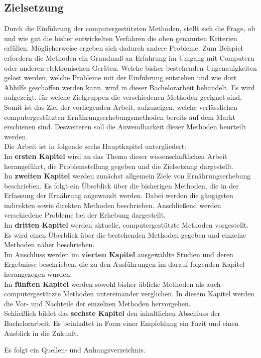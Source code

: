\subsection{Zielsetzung}


Durch die Einführung der computergestützten Methoden, stellt sich die Frage, ob und wie gut die bisher entwickelten Verfahren die oben genannten Kriterien erfüllen. Möglicherweise ergeben sich dadurch andere Probleme. Zum Beispiel erfordern die Methoden ein Grundmaß an Erfahrung im Umgang mit Computern oder anderen elektronischen Geräten. Welche bisher bestehenden Ungenauigkeiten gelöst werden, welche Probleme mit der Einführung entstehen und wie dort Abhilfe geschaffen werden kann, wird in dieser Bachelorarbeit behandelt. Es wird aufgezeigt, für welche Zielgruppen die verschiedenen Methoden geeignet sind.\\
Somit ist das Ziel der vorliegenden Arbeit, aufzuzeigen, welche verlässlichen computergestützten Ernährungserhebungsmethoden bereits auf dem Markt erschienen sind. Desweiteren soll die Anwendbarkeit dieser Methoden beurteilt werden. \\

Die Arbeit ist in folgende sechs Hauptkapitel untergliedert:\\
Im \textbf{ersten Kapitel} wird an das Thema dieser wissenschaftlichen Arbeit herangeführt, die Problemstellung gegeben und die Zielsetzung dargestellt. \\
Im \textbf{zweiten Kapitel} werden zunächst allgemein Ziele von Ernährungserhebung beschrieben. Es folgt ein Überblick über die bisherigen Methoden, die in der Erfassung der Ernährung angewandt werden. Dabei werden die gängigsten indirekten sowie direkten Methoden beschrieben. Anschließend werden verschiedene Probleme bei der Erhebung dargestellt.\\
Im \textbf{dritten Kapitel} werden aktuelle, computergestützte Methoden vorgestellt. Es wird einen Überblick über die bestehenden Methoden gegeben und einzelne Methoden näher beschrieben. \\
Im Anschluss werden im \textbf{vierten Kapitel} ausgewählte Studien und deren Ergebnisse beschrieben, die zu den Ausführungen im darauf folgenden Kapitel herangezogen wurden. \\
Im \textbf{fünften Kapitel} werden sowohl bisher übliche Methoden als auch computergestützte Methoden untereinander verglichen. In diesem Kapitel werden die Vor- und Nachteile der einzelnen Methoden hervorgehen. \\
Schließlich bildet das \textbf{sechste Kapitel} den inhaltlichen Abschluss der Bachelorarbeit. Es beinhaltet in Form einer Empfehlung ein Fazit und einen Ausblick in die Zukunft.

Es folgt ein Quellen- und Anhangsverzeichnis. 

